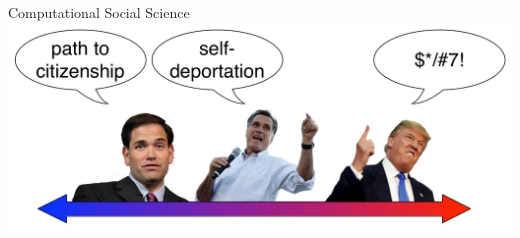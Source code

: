 \documentclass[compress]{beamer}
\begin{document}
{\begin{columns}
   \begin{block}{Computational Social Science}
     \centering
     \includegraphics[width=0.9\linewidth]{teaparty/figures/framing}
     \\
     \small
     \cite{nguyen-13b,nguyen-15}
   \end{block}

\end{columns}

}
\end{document}

